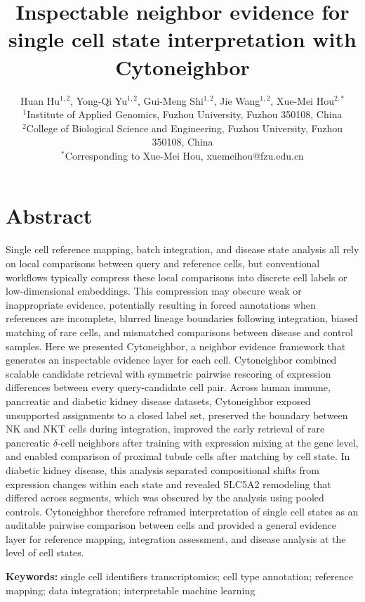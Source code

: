 \documentclass[11pt]{article}
\title{Inspectable neighbor evidence for single cell state interpretation with Cytoneighbor}
\author{
Huan Hu$^{1,2}$, Yong-Qi Yu$^{1,2}$, Gui-Meng Shi$^{1,2}$, Jie Wang$^{1,2}$, Xue-Mei Hou$^{2,\ast}$\\[0.6em]
\small $^{1}$Institute of Applied Genomics, Fuzhou University, Fuzhou 350108, China\\
\small $^{2}$College of Biological Science and Engineering, Fuzhou University, Fuzhou 350108, China\\
\small $^{\ast}$Corresponding to Xue-Mei Hou, xuemeihou@fzu.edu.cn
}
\date{}
\newcommand{\keywords}[1]{%
  \vspace{0.75em}
  \noindent\textbf{Keywords:} #1
}
\begin{document}
\maketitle

\section*{Abstract}

Single cell reference mapping, batch integration, and disease state analysis all rely on local comparisons between query and reference cells, but conventional workflows typically compress these local comparisons into discrete cell labels or low-dimensional embeddings. This compression may obscure weak or inappropriate evidence, potentially resulting in forced annotations when references are incomplete, blurred lineage boundaries following integration, biased matching of rare cells, and mismatched comparisons between disease and control samples. Here we presented Cytoneighbor, a neighbor evidence framework that generates an inspectable evidence layer for each cell. Cytoneighbor combined scalable candidate retrieval with symmetric pairwise rescoring of expression differences between every query-candidate cell pair. Across human immune, pancreatic and diabetic kidney disease datasets, Cytoneighbor exposed unsupported assignments to a closed label set, preserved the boundary between NK and NKT cells during integration, improved the early retrieval of rare pancreatic $\delta$-cell neighbors after training with expression mixing at the gene level, and enabled comparison of proximal tubule cells after matching by cell state. In diabetic kidney disease, this analysis separated compositional shifts from expression changes within each state and revealed SLC5A2 remodeling that differed across segments, which was obscured by the analysis using pooled controls. Cytoneighbor therefore reframed interpretation of single cell states as an auditable pairwise comparison between cells and provided a general evidence layer for reference mapping, integration assessment, and disease analysis at the level of cell states.

\keywords{single cell identifiers transcriptomics; cell type annotation; reference mapping; data integration; interpretable machine learning}
\end{document}
